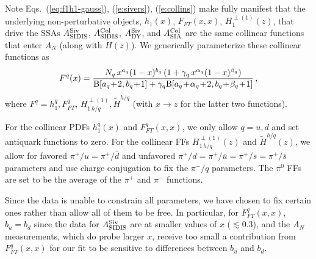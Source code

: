 \documentclass[twocolumn,prl,aps,superscriptaddress
               ,footinbib,amsfonts,amsmath,amssymb,showpacs]{revtex4-1}
\begin{document}
Note Eqs.~(\ref{eq:f1h1-gauss}), (\ref{e:sivers}), (\ref{e:collins})
make fully manifest that the underlying non-perturbative objects, 
    $h_1(x)$, 
    $F_{FT}(x,x)$, 
    $H_1^{\perp(1)}(z)$, 
that drive the SSAs 
    $A_{\rm SIDIS}^{\rm Siv}$, 
    $A_{\rm SIDIS}^{\rm Col}$, 
    $A_{\rm DY}^{\rm Siv}$, 
    and $A_{\rm SIA}^{\rm Col}$ 
are the same collinear functions that enter $A_N$ (along with
$\tilde{H}(z)$).  
%
We generically parameterize these collinear functions as
%
\begin{equation}
F^q(x)=\frac{N_q\,x^{a_q}(1-x)^{b_q}\,(1+\gamma_q\,x^{\alpha_q}(1-x)^{\beta_q})}
            {{\rm B}[a_q\!+\!2,b_q\!+\!1]
             +\gamma_q {\rm B}[a_q\!
             +\!\alpha_q\!+\!2,b_q\!
             +\!\beta_q\!+\!1]}   
\,, 
\label{e:colfunc}
\end{equation}
%
where $F^q=h_1^q,F_{FT}^q$, $H_{1 \,h/q}^{\perp (1)}, \tilde{H}^{h/q}$
(with $x\to z$ for the latter two functions).
%

For the collinear PDFs $h_1^q(x)$ and $F_{FT}^q(x,x)$, we only allow
$q=u,d$ and set antiquark functions to zero.
%
For the collinear FFs $H_{1 \,h/q}^{\perp (1)}(z)$ and $\tilde{H}^{h/q}(z)$, 
we allow for favored $\pi^+/u=\pi^+/\bar{d}$ and unfavored
$\pi^+/d=\pi^+/\bar{u}=\pi^+/s=\pi^+/\bar{s}$ parameters and use
charge conjugation to fix the $\pi^-/q$ parameters.  
%
The $\pi^0$ FFs are set to be the average of the $\pi^+$ and $\pi^-$
functions.  

Since the data is unable to constrain all parameters, we have chosen
to fix certain ones rather than allow all of them to be free.
%
In particular, for $F_{FT}^q(x,x)$, $b_u=b_d$ since the data for
$A_{\rm SIDIS}^{\rm Siv}$ are at smaller values of $x$ ($\lesssim
0.3$), and the $A_N$ measurements, which do probe larger $x$, receive
too small a contribution from $F_{FT}^q(x,x)$ for our fit to be
sensitive to differences between $b_u$ and $b_d$. 
\end{document}
